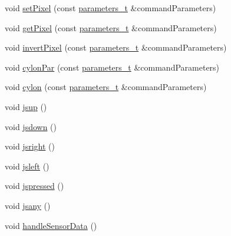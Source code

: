\begin{DoxyCompactItemize}
\item 
void \hyperlink{class_m_q_t_tsense_h_a_t_a2c2134187487882f89a850b6a7f010ec}{set\+Pixel} (const \hyperlink{_heater_m_q_t_t_8h_ad3b3bd6544a775cf1e31cd71610c5765}{parameters\+\_\+t} \&command\+Parameters)
\item 
void \hyperlink{class_m_q_t_tsense_h_a_t_aac431239ec91b0c7647fc90f2780d5e3}{get\+Pixel} (const \hyperlink{_heater_m_q_t_t_8h_ad3b3bd6544a775cf1e31cd71610c5765}{parameters\+\_\+t} \&command\+Parameters)
\item 
void \hyperlink{class_m_q_t_tsense_h_a_t_ae5172290839c6af0821f41bae9cf30c7}{invert\+Pixel} (const \hyperlink{_heater_m_q_t_t_8h_ad3b3bd6544a775cf1e31cd71610c5765}{parameters\+\_\+t} \&command\+Parameters)
\item 
void \hyperlink{class_m_q_t_tsense_h_a_t_a0c2faf77463954149558afc54f965f65}{cylon\+Par} (const \hyperlink{_heater_m_q_t_t_8h_ad3b3bd6544a775cf1e31cd71610c5765}{parameters\+\_\+t} \&command\+Parameters)
\item 
void \hyperlink{class_m_q_t_tsense_h_a_t_ad70cc61332aefd376e2fafd026e51144}{cylon} (const \hyperlink{_heater_m_q_t_t_8h_ad3b3bd6544a775cf1e31cd71610c5765}{parameters\+\_\+t} \&command\+Parameters)
\item 
void \hyperlink{class_m_q_t_tsense_h_a_t_a5d0f57ce2e94813cfa2279d17e4905ae}{jsup} ()
\item 
void \hyperlink{class_m_q_t_tsense_h_a_t_a49af5e2cafdc045b070601e2046ae32c}{jsdown} ()
\item 
void \hyperlink{class_m_q_t_tsense_h_a_t_a94f4010486bd20e7f1ffd602ab4a6df8}{jsright} ()
\item 
void \hyperlink{class_m_q_t_tsense_h_a_t_ab02c2741dda318559e3f22b85ecd9b28}{jsleft} ()
\item 
void \hyperlink{class_m_q_t_tsense_h_a_t_a4a4c34f1818a47a9e111050cdaf94157}{jspressed} ()
\item 
void \hyperlink{class_m_q_t_tsense_h_a_t_ae4e0f972b1ed819bad5954501b8e2597}{jsany} ()
\item 
void \hyperlink{class_m_q_t_tsense_h_a_t_a86bd30bf5003330703c0eca3d29df629}{handle\+Sensor\+Data} ()
\end{DoxyCompactItemize}

